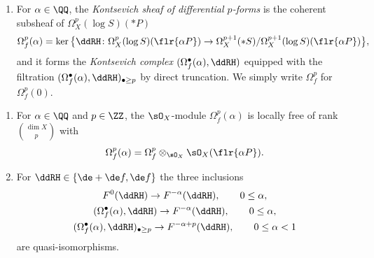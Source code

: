 \begin{definition*}
\begin{enumerate}
\item[(iv)] For $\alpha\in\QQ$, the \textit{Kontsevich sheaf of differential $p$-forms} is the coherent subsheaf of $\Omega_X^p(\log S)(*P)$
\begin{gather*} \Omega_f^p(\alpha) = \ker\big\{ \ddRH\colon \Omega_X^p(\log S)(\flr{\alpha P}) \to \Omega_X^{p+1}(*S)/\Omega_X^{p+1}(\log S)(\flr{\alpha P}) \big\}, \end{gather*}
and it forms the \textit{Kontsevich complex} $(\Omega_f^\bullet(\alpha), \ddRH)$ equipped with the filtration $(\Omega_f^\bullet(\alpha), \ddRH)_{\bullet\geq p}$ by direct truncation. We simply write $\Omega_f^p$ for $\Omega_f^p(0)$.
\end{enumerate}
\end{definition*}

\begin{proposition}\label{Prop:Kont-Log}\quad
\begin{enumerate}\itemsep=0pt
\item For $\alpha\in\QQ$ and $p\in\ZZ$, the $\sO_X$-module $\Omega_f^p(\alpha)$ is locally free of rank $\binom{\dim X}{p}$ with
\begin{gather*} \Omega_f^p(\alpha) = \Omega_f^p \otimes_{\sO_X}\sO_X(\flr{\alpha P}). \end{gather*}
\item For $\ddRH\in\{\de +\de f, \de f\}$ the three inclusions
\begin{gather*}
F^0(\ddRH) \to F^{-\alpha}(\ddRH), \qquad 0\leq \alpha, \\
(\Omega_f^\bullet(\alpha),\ddRH) \to F^{-\alpha}(\ddRH), \qquad 0\leq \alpha, \\
(\Omega_f^\bullet(\alpha),\ddRH)_{\bullet\geq p} \to F^{-\alpha +p}(\ddRH), \qquad 0\leq \alpha <1
\end{gather*}
are quasi-isomorphisms.
\end{enumerate}
\end{proposition}

